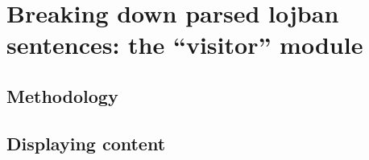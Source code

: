 \chapter{Breaking down parsed lojban sentences: the ``visitor'' module}

\section{Methodology}

\section{Displaying content}


